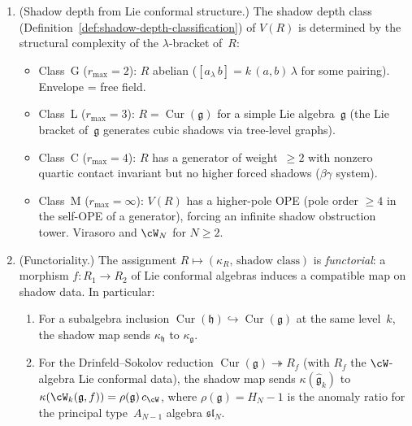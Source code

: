 \begin{proposition}
\begin{enumerate}[label=\textup{(\roman*)}]
\item \textup{(Shadow depth from Lie conformal structure.)}
 The shadow depth class
 \textup{(}Definition~\textup{\ref{def:shadow-depth-classification})} of
 $V(R)$ is determined by the structural complexity of the
 $\lambda$-bracket of~$R$:
 \begin{itemize}
 \item Class~G \textup{(}$r_{\max} = 2$\textup{)}: $R$ abelian
 \textup{(}$[a_\lambda\, b] = k\,(a, b)\, \lambda$ for some
 pairing\textup{)}. Envelope = free field.
 \item Class~L \textup{(}$r_{\max} = 3$\textup{)}: $R = \operatorname{Cur}(\mathfrak{g})$
 for a simple Lie algebra~$\mathfrak{g}$
 \textup{(}the Lie bracket of~$\mathfrak{g}$ generates cubic
 shadows via tree-level graphs\textup{)}.
 \item Class~C \textup{(}$r_{\max} = 4$\textup{)}: $R$ has a
 generator of weight~$\geq 2$ with nonzero quartic contact
 invariant but no higher forced shadows
 \textup{(}$\beta\gamma$ system\textup{)}.
 \item Class~M \textup{(}$r_{\max} = \infty$\textup{)}:
 $V(R)$ has a higher-pole OPE \textup{(}pole order $\geq 4$
 in the self-OPE of a generator\textup{)}, forcing an infinite
 shadow obstruction tower. Virasoro and $\cW_N$ for $N \geq 2$.
 \end{itemize}

\item \textup{(Functoriality.)}
 The assignment $R \mapsto (\kappa_R,\, \text{shadow class})$ is
 \emph{functorial}: a morphism $f \colon R_1 \to R_2$ of Lie
 conformal algebras induces a compatible map on shadow data.
 In particular:
 \begin{enumerate}[label=\textup{(\alph*)}]
 \item For a subalgebra inclusion
 $\operatorname{Cur}(\mathfrak{h}) \hookrightarrow
 \operatorname{Cur}(\mathfrak{g})$ at the same level~$k$,
 the shadow map sends $\kappa_{\mathfrak{h}}$ to
 $\kappa_{\mathfrak{g}}$.
 \item For the Drinfeld--Sokolov reduction
 $\operatorname{Cur}(\mathfrak{g}) \twoheadrightarrow R_f$
 \textup{(}with $R_f$ the $\cW$-algebra Lie conformal
 data\textup{)}, the shadow map sends
$\kappa(\widehat{\mathfrak{g}}_k)$ to
$\kappa(\cW_k(\mathfrak{g}, f)) = \rho(\mathfrak{g})\, c_{\cW}$,
where $\rho(\mathfrak{g}) = H_N - 1$ is the anomaly ratio
for the principal type~$A_{N-1}$ algebra $\mathfrak{sl}_N$.
 \end{enumerate}
\end{enumerate}
\end{proposition}

